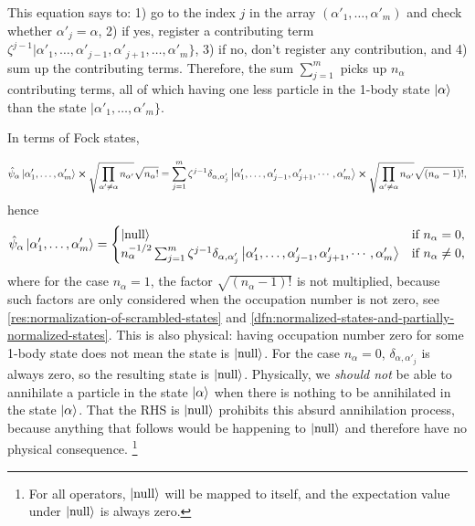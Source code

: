 \documentclass{article}
\theoremstyle{definition}
\numberwithin{equation}{section}
\begin{document}
This equation says to: 1) go to the index $j$ 
in the array 
$(\alpha'_{1}, \ldots ,\alpha'_{m})$ 
and check whether $\alpha'_{j}=\alpha$, 
2) if yes, register a contributing term 
$
    \zeta^{j-1}
    |\alpha'_{1}, \ldots ,\alpha'_{j-1},
    \alpha'_{j+1}, \ldots ,\alpha'_{m}\}
$, 
3) if no, don't register any contribution, and 
4) sum up the contributing terms.
Therefore, the sum 
$\sum_{j=1}^{m}$ picks up $n_{\alpha}$ 
contributing terms, all of which 
having one less particle in the 1-body state 
$\ket{\alpha}$ than the state 
$|\alpha'_{1}, \ldots ,\alpha'_{m}\}$.

In terms of Fock states, 

\[
    \hat{\psi}_{\alpha}
    \ket{\alpha'_{1}, \ldots ,\alpha'_{m}}
    \cross 
    \sqrt{
        \prod_{\alpha'\neq \alpha}
        n_{\alpha'}
    }
    \sqrt{n_{\alpha}!}
    =
    \sum_{j=1}^{m}
    \zeta^{j-1}
    \delta_{\alpha,\alpha'_{j}}
    \ket{
        \alpha'_{1}, \ldots ,
        \alpha'_{j-1},\alpha'_{j+1},
        \cdots ,\alpha'_{m}
    }
    \cross 
    \sqrt{
        \prod_{\alpha'\neq \alpha}
        n_{\alpha'}
    }
    \sqrt{(n_{\alpha}-1)!},
\]
hence 
\[
    \hat{\psi}_{\alpha}
    \ket{\alpha'_{1}, \ldots ,\alpha'_{m}}
    =
    \begin{cases}
        \ket{\text{null}} & \text{if  } n_{\alpha}=0,\\
        n_{\alpha}^{-1 /2}
        \sum_{j=1}^{m}
    \zeta^{j-1}
    \delta_{\alpha,\alpha'_{j}}
    \ket{
        \alpha'_{1}, \ldots ,
        \alpha'_{j-1},\alpha'_{j+1},
        \cdots ,\alpha'_{m}
    }
    & \text{if  } n_{\alpha}\neq 0,
    \end{cases}
\]
where for the case $n_{\alpha}=1$, 
the factor $\sqrt{(n_{\alpha}-1)!}$ 
is not multiplied, because such factors 
are only considered when the occupation number 
is not zero, see \cref{res:normalization-of-scrambled-states} 
and \cref{dfn:normalized-states-and-partially-normalized-states}. 
This is also physical: having occupation number zero 
for some 1-body state does not mean the state is $\ket{\text{null}}$. 
For the case $n_{\alpha}=0$, 
$\delta_{\alpha,\alpha'_{j}}$ is always zero, 
so the resulting state is $\ket{\text{null}}$.
Physically, we 
\emph{should not} be able to annihilate a particle 
in the state $\ket{\alpha}$ when there is nothing 
to be annihilated in the state $\ket{\alpha}$. 
That the RHS is $\ket{\text{null}}$ 
prohibits this absurd annihilation process, because 
anything that follows would 
be happening to $\ket{\text{null}}$ and therefore 
have no physical 
consequence. 
\footnote{
For all operators, 
$\ket{\text{null}}$ will be mapped to itself, 
and the expectation value under $\ket{\text{null}}$ 
is always zero.
}
\end{document}
